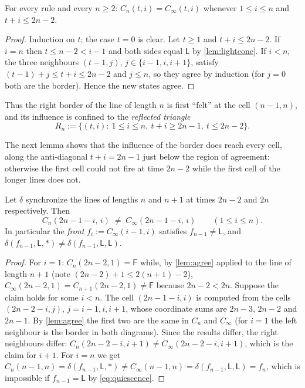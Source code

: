 \begin{lemma}[agreement]\label{lem:agree}
For every rule and every $n\ge 2$: $C_n(t,i)=C_\infty(t,i)$ whenever
$1\le i\le n$ and $t+i\le 2n-2$.
\end{lemma}

\begin{proof}
Induction on $t$; the case $t=0$ is clear. Let $t\ge1$ and $t+i\le 2n-2$.
If $i=n$ then $t\le n-2<i-1$ and both sides equal $\mathsf L$ by
\cref{lem:lightcone}. If $i<n$, the three neighbours $(t-1,j)$,
$j\in\{i-1,i,i+1\}$, satisfy $(t-1)+j\le t+i\le 2n-2$ and $j\le n$, so they
agree by induction (for $j=0$ both are the border). Hence the new states
agree.
\end{proof}

Thus the right border of the line of length $n$ is first ``felt'' at the
cell $(n-1,n)$, and its influence is confined to the \emph{reflected
triangle}
\[
R_n:=\{(t,i):\ 1\le i\le n,\ t+i\ge 2n-1,\ t\le 2n-2\}.
\]

The next lemma shows that the influence of the border does reach every
cell, along the anti-diagonal $t+i=2n-1$ just below the region of
agreement: otherwise the first cell could not fire at time $2n-2$ while the
first cell of the longer lines does not.

\begin{lemma}\label{lem:return}
Let $\delta$ synchronize the lines of lengths $n$ and $n+1$ at times $2n-2$
and $2n$ respectively. Then
\[
C_n(2n-1-i,\,i)\;\neq\;C_\infty(2n-1-i,\,i)\qquad(1\le i\le n).
\]
In particular the \emph{front} $f_i:=C_\infty(i-1,i)$ satisfies
$f_{n-1}\neq\mathsf L$, and $\delta(f_{n-1},\mathsf L,\ast)\neq
\delta(f_{n-1},\mathsf L,\mathsf L)$.
\end{lemma}

\begin{proof}
For $i=1$: $C_n(2n-2,1)=\mathsf F$ while, by \cref{lem:agree} applied to
the line of length $n+1$ (note $(2n-2)+1\le 2(n+1)-2$),
$C_\infty(2n-2,1)=C_{n+1}(2n-2,1)\neq\mathsf F$ because $2n-2<2n$.
Suppose the claim holds for some $i<n$. The cell $(2n-1-i,i)$ is computed
from the cells $(2n-2-i,j)$, $j=i-1,i,i+1$, whose coordinate sums are
$2n-3$, $2n-2$ and $2n-1$. By \cref{lem:agree} the first two are the same
in $C_n$ and $C_\infty$ (for $i=1$ the left neighbour is the border in both
diagrams). Since the results differ, the right neighbours differ:
$C_n(2n-2-i,i+1)\ne C_\infty(2n-2-i,i+1)$, which is the claim for $i+1$.
For $i=n$ we get $C_n(n-1,n)=\delta(f_{n-1},\mathsf L,\ast)\neq
C_\infty(n-1,n)=\delta(f_{n-1},\mathsf L,\mathsf L)=f_n$, which is impossible
if $f_{n-1}=\mathsf L$ by \eqref{eq:quiescence}.
\end{proof}


